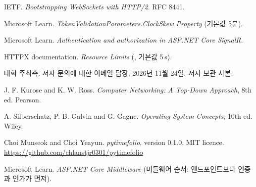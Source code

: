 \par\Needspace{40mm}\seclabel
{}
\begin{list}{}{\setlength{\leftmargin}{7mm}\setlength{\labelwidth}{6mm}\setlength{\labelsep}{1mm}\setlength{\itemsep}{2pt}\setlength{\parsep}{0pt}\setlength{\topsep}{2pt}\RaggedRight{}\relax}
\item[{[1]}] IETF. \textit{Bootstrapping WebSockets with HTTP/2}. RFC 8441.
\item[{[2]}] Microsoft Learn. \textit{TokenValidationParameters.ClockSkew Property} (기본값 5분).
\item[{[3]}] Microsoft Learn. \textit{Authentication and authorization in ASP.NET Core SignalR}.
\item[{[4]}] HTTPX documentation. \textit{Resource Limits} (, 기본값 5\,s).
\item[{[5]}] 대회 주최측. 저자 문의에 대한 이메일 답장, 2026년 11월 24일. 저자 보관 사본.
\item[{[6]}] J. F. Kurose and K. W. Ross. \textit{Computer Networking: A Top-Down Approach}, 8th ed. Pearson.
\item[{[7]}] A. Silberschatz, P. B. Galvin and G. Gagne. \textit{Operating System Concepts}, 10th ed. Wiley.
\item[{[8]}] Choi Munseok and Choi Yeayun. \textit{pytimefolio}, version 0.1.0, MIT licence. \url{https://github.com/chlanstjr0301/pytimefolio}
\item[{[9]}] Microsoft Learn. \textit{ASP.NET Core Middleware} (미들웨어 순서: 엔드포인트보다 인증과 인가가 먼저).
\end{list}
